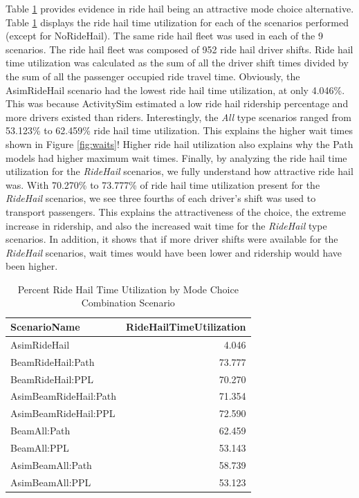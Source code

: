 \documentclass[12pt, oneside, openright]{byuthesis}
\begin{document}
Table \ref{tab:timeutil} provides evidence in ride hail being an attractive mode choice alternative. Table \ref{tab:timeutil} displays the ride hail time utilization for each of the scenarios performed (except for NoRideHail). The same ride hail fleet was used in each of the 9 scenarios. The ride hail fleet was composed of 952 ride hail driver shifts. Ride hail time utilization was calculated as the sum of all the driver shift times divided by the sum of all the passenger occupied ride travel time. Obviously, the AsimRideHail scenario had the lowest ride hail time utilization, at only 4.046\%. This was because ActivitySim estimated a low ride hail ridership percentage and more drivers existed than riders. Interestingly, the \emph{All} type scenarios ranged from 53.123\% to 62.459\% ride hail time utilization. This explains the higher wait times shown in Figure \ref{fig:waits}! Higher ride hail utilization also explains why the Path models had higher maximum wait times. Finally, by analyzing the ride hail time utilization for the \emph{RideHail} scenarios, we fully understand how attractive ride hail was. With 70.270\% to 73.777\% of ride hail time utilization present for the \emph{RideHail} scenarios, we see three fourths of each driver's shift was used to transport passengers. This explains the attractiveness of the choice, the extreme increase in ridership, and also the increased wait time for the \emph{RideHail} type scenarios. In addition, it shows that if more driver shifts were available for the \emph{RideHail} scenarios, wait times would have been lower and ridership would have been higher.

\begin{table}

\caption{\label{tab:timeutil}Percent Ride Hail Time Utilization by Mode Choice Combination Scenario}
\centering
\begin{tabular}[t]{lr}
\toprule
ScenarioName & RideHailTimeUtilization\\
\midrule
AsimRideHail & 4.046\\
BeamRideHail:Path & 73.777\\
BeamRideHail:PPL & 70.270\\
AsimBeamRideHail:Path & 71.354\\
AsimBeamRideHail:PPL & 72.590\\
\addlinespace
BeamAll:Path & 62.459\\
BeamAll:PPL & 53.143\\
AsimBeamAll:Path & 58.739\\
AsimBeamAll:PPL & 53.123\\
\bottomrule
\end{tabular}
\end{table}
\end{document}
